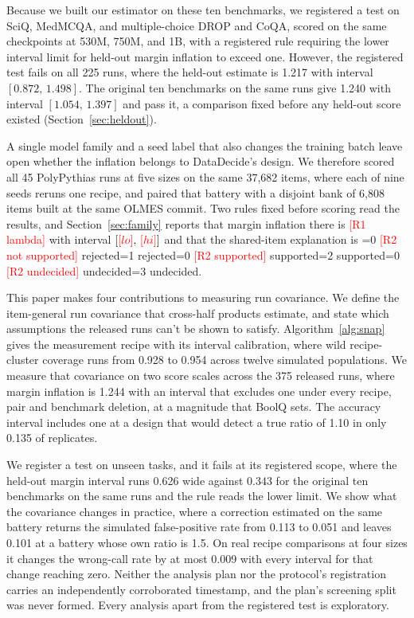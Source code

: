 \documentclass{article}
\newcommand{\ci}[2]{\ensuremath{[#1,\,#2]}}
\newcommand{\pending}[1]{\textcolor{red}{[#1]}}
\newcommand{\Rtwocase}{0}
\newcommand{\outcome}[4]{\ifnum#1=0 \pending{#3} #4\else\ifnum#1=#2 #4\fi\fi}
\begin{document}
Because we built our estimator on these ten benchmarks, we registered a test on SciQ, MedMCQA, and multiple-choice DROP and CoQA, scored on the same checkpoints at 530M, 750M, and 1B, with a registered rule requiring the lower interval limit for held-out margin inflation to exceed one. However, the registered test fails on all 225 runs, where the held-out estimate is 1.217 with interval \ci{0.872}{1.498}. The original ten benchmarks on the same runs give 1.240 with interval \ci{1.054}{1.397} and pass it, a comparison fixed before any held-out score existed (Section~\ref{sec:heldout}).

A single model family and a seed label that also changes the training batch leave open whether the inflation belongs to DataDecide's design. We therefore scored all 45 PolyPythias runs at five sizes on the same 37,682 items, where each of nine seeds reruns one recipe, and paired that battery with a disjoint bank of 6,808 items built at the same OLMES commit. Two rules fixed before scoring read the results, and Section~\ref{sec:family} reports that margin inflation there is \pending{R1 lambda} with interval \ci{\pending{lo}}{\pending{hi}} and that the shared-item explanation is \outcome{\Rtwocase}{1}{R2 not supported}{rejected}\outcome{\Rtwocase}{2}{R2 supported}{supported}\outcome{\Rtwocase}{3}{R2 undecided}{undecided}.

This paper makes four contributions to measuring run covariance. We define the item-general run covariance that cross-half products estimate, and state which assumptions the released runs can't be shown to satisfy. Algorithm~\ref{alg:snap} gives the measurement recipe with its interval calibration, where wild recipe-cluster coverage runs from 0.928 to 0.954 across twelve simulated populations. We measure that covariance on two score scales across the 375 released runs, where margin inflation is 1.244 with an interval that excludes one under every recipe, pair and benchmark deletion, at a magnitude that BoolQ sets. The accuracy interval includes one at a design that would detect a true ratio of 1.10 in only 0.135 of replicates.

We register a test on unseen tasks, and it fails at its registered scope, where the held-out margin interval runs 0.626 wide against 0.343 for the original ten benchmarks on the same runs and the rule reads the lower limit. We show what the covariance changes in practice, where a correction estimated on the same battery returns the simulated false-positive rate from 0.113 to 0.051 and leaves 0.101 at a battery whose own ratio is 1.5. On real recipe comparisons at four sizes it changes the wrong-call rate by at most 0.009 with every interval for that change reaching zero. Neither the analysis plan nor the protocol's registration carries an independently corroborated timestamp, and the plan's screening split was never formed. Every analysis apart from the registered test is exploratory.
\end{document}
